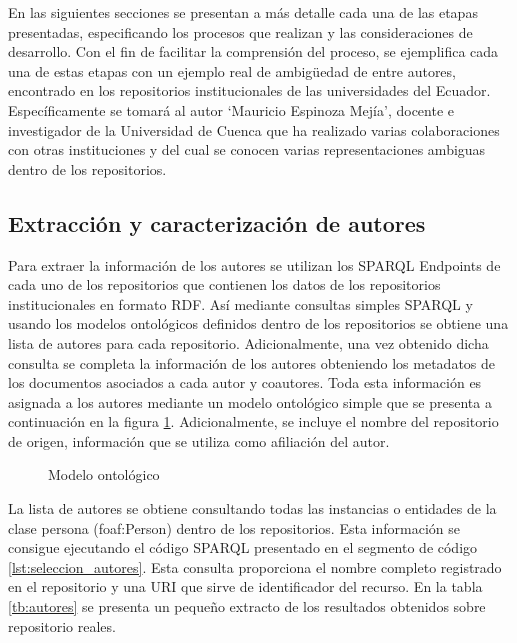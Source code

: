 \documentclass[conference]{IEEEtran}
\begin{document}
En las siguientes secciones se presentan a más detalle cada una de las etapas presentadas, especificando los procesos que realizan y las consideraciones de desarrollo. Con el fin de facilitar la comprensión del proceso, se ejemplifica cada una de estas etapas con un ejemplo real de ambigüedad de entre autores, encontrado en los repositorios institucionales de las universidades del Ecuador.  Específicamente se tomará al autor ‘Mauricio Espinoza Mejía’, docente e investigador de la Universidad de Cuenca que ha realizado varias colaboraciones con otras instituciones y del cual se conocen varias representaciones ambiguas dentro de los repositorios.

\subsection{Extracción y caracterización de autores}
Para extraer la información de los autores se utilizan los SPARQL Endpoints de cada uno de los repositorios que contienen los datos de los repositorios institucionales en formato RDF. Así mediante consultas simples SPARQL y usando los modelos ontológicos definidos dentro de los repositorios se obtiene una lista de autores para cada repositorio. Adicionalmente, una vez obtenido dicha consulta se completa  la información de los autores obteniendo los metadatos de los  documentos asociados a cada autor y coautores. Toda esta información es asignada a los autores mediante un modelo ontológico simple que se presenta a continuación en la figura \ref{fig:modelo_ontologico}. Adicionalmente, se incluye el nombre del repositorio de origen, información que se utiliza como afiliación del autor.

\begin{figure}[!t]
\centering
\caption{Modelo ontol\'ogico}
\label{fig:modelo_ontologico}
\end{figure}

La lista de autores se obtiene consultando todas las instancias o entidades de la clase persona (foaf:Person) dentro de los repositorios. Esta información se consigue ejecutando el código SPARQL presentado en el segmento de código \ref{lst:seleccion_autores}. Esta consulta proporciona el nombre completo registrado en el repositorio y una URI que sirve de identificador del recurso. En la tabla \ref{tb:autores} se presenta un pequeño extracto de los resultados obtenidos sobre repositorio reales.
\end{document}

